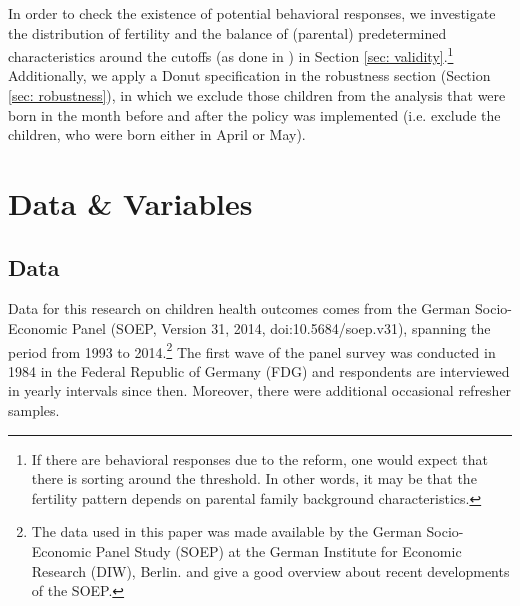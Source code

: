 \documentclass[a4paper ]{article}
\begin{document}
In order to check the existence of potential behavioral responses, we investigate the distribution of fertility and the balance of (parental) predetermined characteristics around the cutoffs (as done in \cite{dinardo2004economic}) in Section \ref{sec: validity}.\footnote{If there are behavioral responses due to the reform, one would expect that there is sorting around the threshold. In other words, it may be that the fertility pattern depends on parental family background characteristics.} Additionally, we apply a Donut specification in the robustness section (Section \ref{sec: robustness}), in which we exclude those children from the analysis that were born in the month before and after the policy was implemented (i.e. exclude the children, who were born either in April or May).





\section{Data \& Variables}\label{sec: Data}
\subsection{Data}

Data for this research on children health outcomes comes from the German Socio-Economic Panel (SOEP, Version 31, 2014, doi:10.5684/soep.v31), spanning the period from 1993 to 2014.\footnote{The data used in this paper was made available by the German Socio-Economic Panel Study (SOEP) at the German Institute for Economic Research (DIW), Berlin. \cite{wagner2007german} and \cite{schupp200925} give a good overview about recent developments of the SOEP.} The first wave of the panel survey was conducted in 1984 in the Federal Republic of Germany (FDG) and respondents are interviewed in yearly intervals since then. Moreover, there were additional occasional refresher samples.
\end{document}
